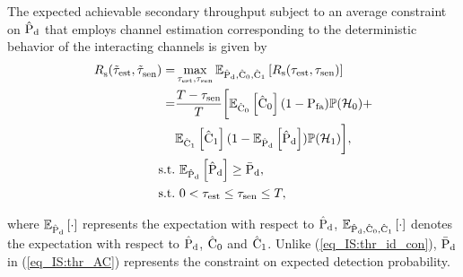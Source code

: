 \begin{theorem} \label{th_IS:th1}
\normalfont
The expected achievable secondary throughput subject to an average constraint on $\epd$ that employs channel estimation corresponding to the deterministic behavior of the interacting channels is given by  
\begin{align}
\trsac(\ttest, \ttsenac) =& \maxi_{\tc{\test}, \tsen} \e{\epd, \ecz, \eco}{\rs(\test, \tsen)} \nonumber \\ 
\quad =& \frac{T- \tsen}{T} \bigg[ \e{\ecz}{\ecz} (1 - \pfa) \phz + \nonumber \\ \quad & \e{\eco}{\eco} (1 - \e{\epd}{\epd}) \pho  \bigg], \label{eq_IS:thr_AC} \\
\text{s.t.} & \text{ }  \e{\epd}{\epd} \ge \pdd, \label{eq_IS:AC} \\
\tc{\text{s.t.}} & \text{ }  \tc{0 < \test \le \tsen \le T,} \nonumber
\end{align}
\end{theorem} 
where $\e{\epd}{\cdot}$ represents the expectation with respect to $\epd$, $\e{\epd, \ecz, \eco}{\cdot}$ denotes the expectation with respect to $\epd$, $\ecz$ and $\eco$. Unlike (\ref{eq_IS:thr_id_con}), $\pdd$ in (\ref{eq_IS:thr_AC}) represents the constraint on expected detection probability.

\begin{IEEEproof}[Solution]
\end{IEEEproof}

